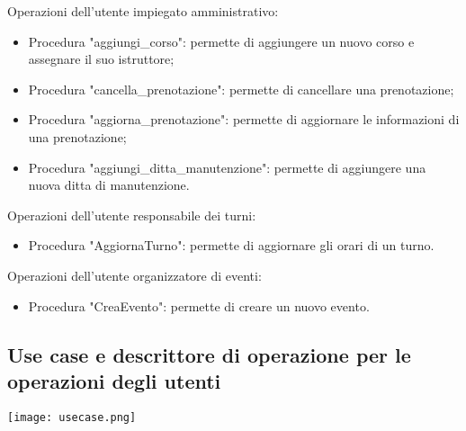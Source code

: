 \documentclass{article}
\begin{document}
    \begin{flushleft}
        Operazioni dell'utente impiegato amministrativo: \\
        \begin{itemize}
            \item Procedura "aggiungi\_corso": permette di aggiungere un nuovo corso e assegnare il suo istruttore;
            \item Procedura "cancella\_prenotazione": permette di cancellare una prenotazione;
            \item Procedura "aggiorna\_prenotazione": permette di aggiornare le informazioni di una prenotazione;
            \item Procedura "aggiungi\_ditta\_manutenzione": permette di aggiungere una nuova ditta di manutenzione.
        \end{itemize}
        Operazioni dell'utente responsabile dei turni:
        \begin{itemize}
            \item Procedura "AggiornaTurno": permette di aggiornare gli orari di un turno.
        \end{itemize}
        Operazioni dell'utente organizzatore di eventi:
        \begin{itemize}
            \item Procedura "CreaEvento": permette di creare un nuovo evento.
        \end{itemize}
    \end{flushleft}

\subsection{Use case e descrittore di operazione per le operazioni degli utenti}
    \begin{center}
        \texttt{[image: usecase.png]}  
    \end{center}
\end{document}
